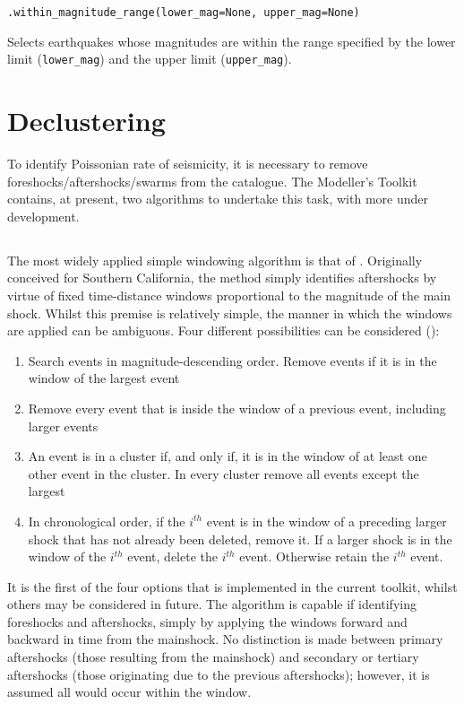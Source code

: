 \verb;.within_magnitude_range(lower_mag=None, upper_mag=None);

Selects earthquakes whose magnitudes are within the range specified by the lower limit (\verb=lower_mag=) and the upper limit (\verb=upper_mag=).

\section{Declustering}

To identify Poissonian rate of seismicity, it is necessary to remove foreshocks/aftershocks/swarms from the catalogue. The Modeller's Toolkit contains, at present, two algorithms to undertake this task, with more under development.

\subsection{\cite{GardnerKnopoff1974}}

The most widely applied simple windowing algorithm is that of 
\cite{GardnerKnopoff1974}. Originally conceived for Southern California, 
the method simply identifies aftershocks by virtue of fixed time-distance
windows proportional to the magnitude of the main shock. Whilst this 
premise is relatively simple, the manner in which the windows are 
applied can be ambiguous. Four different possibilities can be 
considered (\cite{LuenStark2012}):

\begin{enumerate}
\item Search events in magnitude-descending order. Remove events if it is 
    in the window of the largest event
\item Remove every event that is inside the window of a previous event, 
    including larger events
\item An event is in a cluster if, and only if, it is in the window of at 
    least one other event in the cluster. In every cluster remove all 
    events except the largest
\item In chronological order, if the $i^{th}$ event is in the window of a 
    preceding larger shock that has not already been deleted, remove it. 
    If a larger shock is in the window of the $i^{th}$ event, delete the 
    $i^{th}$ event. Otherwise retain the $i^{th}$ event.
\end{enumerate}

It is the first of the four options that is implemented in the current 
toolkit, whilst others may be considered in future.  The algorithm is 
capable if identifying foreshocks and aftershocks, simply by applying 
the windows forward and backward in time from the mainshock. 
No distinction is made between primary aftershocks (those resulting 
from the mainshock) and secondary or tertiary aftershocks (those 
originating due to the previous aftershocks); however, it is assumed 
all would occur within the window.

